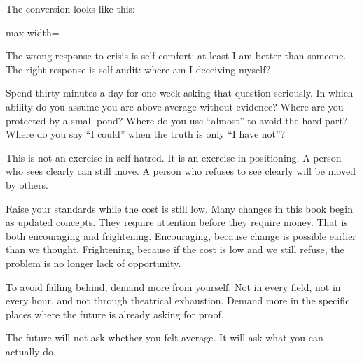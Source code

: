 The conversion looks like this:

\begin{center}
\begin{adjustbox}{max width=\linewidth}
\end{adjustbox}
\end{center}

The wrong response to crisis is self-comfort: at least I am better than someone. The right response is self-audit: where am I deceiving myself?

Spend thirty minutes a day for one week asking that question seriously. In which ability do you assume you are above average without evidence? Where are you protected by a small pond? Where do you use ``almost'' to avoid the hard part? Where do you say ``I could'' when the truth is only ``I have not''?

This is not an exercise in self-hatred. It is an exercise in positioning. A person who sees clearly can still move. A person who refuses to see clearly will be moved by others.

Raise your standards while the cost is still low. Many changes in this book begin as updated concepts. They require attention before they require money. That is both encouraging and frightening. Encouraging, because change is possible earlier than we thought. Frightening, because if the cost is low and we still refuse, the problem is no longer lack of opportunity.

To avoid falling behind, demand more from yourself. Not in every field, not in every hour, and not through theatrical exhaustion. Demand more in the specific places where the future is already asking for proof.

The future will not ask whether you felt average. It will ask what you can actually do.
